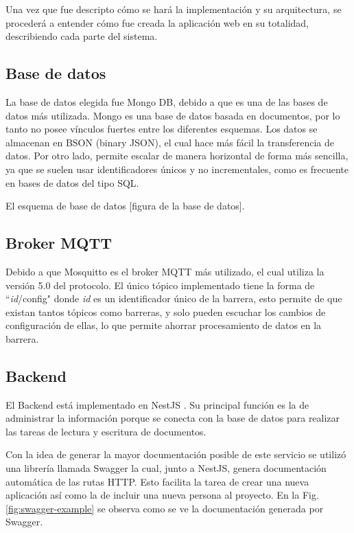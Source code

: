 Una vez que fue descripto cómo se hará la implementación y su arquitectura, se procederá a entender cómo fue creada la aplicación web en su totalidad, describiendo cada parte del sistema.

\subsection{Base de datos}

La base de datos elegida fue Mongo DB, debido a que es una de las bases de datos más utilizada. Mongo es una base de datos basada en documentos, por lo tanto no posee vínculos fuertes entre los diferentes esquemas.
Los datos se almacenan en BSON (binary JSON), el cual hace más fácil la transferencia de datos. Por otro lado, permite escalar de manera horizontal de forma más sencilla, ya que se suelen usar identificadores únicos y no incrementales, como es frecuente en bases de datos del tipo SQL.

El esquema de base de datos [figura de la base de datos].

\subsection{Broker MQTT}

Debido a que Mosquitto es el broker MQTT más utilizado, el cual utiliza la versión 5.0 del protocolo. El único tópico implementado tiene la forma de ``\textit{id}/config" donde \textit{id} es un identificador único de la barrera, esto permite de que existan tantos tópicos como barreras, y solo pueden escuchar los cambios de configuración de ellas, lo que permite ahorrar procesamiento de datos en la barrera.

\subsection{Backend}

El Backend está implementado en NestJS \cite{noauthor_documentacion_nodate}. Su principal función es la de administrar la información porque se conecta con la base de datos para realizar las tareas de lectura y escritura de documentos.

Con la idea de generar la mayor documentación posible de este servicio se utilizó una librería llamada Swagger la cual, junto a NestJS, genera documentación automática de las rutas HTTP. Esto facilita la tarea de crear una nueva aplicación así como la de incluir una nueva persona al proyecto. En la Fig. \ref{fig:swagger-example} se observa como se ve la documentación generada por Swagger.

